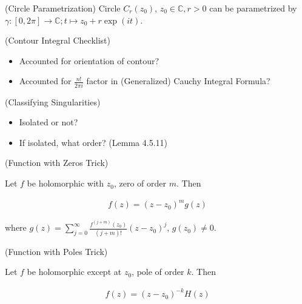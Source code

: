 \documentclass[10pt,landscape]{article}
\begin{document}
\begin{multicols}{3}
\begin{example}{(Circle Parametrization)}{}
    Circle $C_r(z_0)$, $z_0 \in \mathbb{C}, r > 0$ can be parametrized by $\gamma: [0,2\pi] \to \mathbb{C}; t \mapsto z_0 + r \exp\!{(it)}$.

\end{example}

\begin{remark}{(Contour Integral Checklist)}{}

    \begin{itemize}
        \setlength{\parskip}{0em}
        \renewcommand{\labelitemi}{\scriptsize$\square$}
        \item Accounted for orientation of contour?
        \item Accounted for $\frac{n!}{2\pi i}$ factor in (Generalized) Cauchy Integral Formula?
    \end{itemize}

\end{remark}

\begin{remark}{(Classifying Singularities)}{}

    \begin{itemize}
        \setlength{\parskip}{0em}
        \renewcommand{\labelitemi}{\scriptsize$\square$}
        \item Isolated or not?
        \item If isolated, what order? (Lemma 4.5.11)
    \end{itemize}

\end{remark}

\begin{remark}{(Function with Zeros Trick)}{}

    Let $f$ be holomorphic with $z_0$, zero of order $m$. Then

        \begin{align*}
            f(z) = (z - z_0)^m g(z)
        \end{align*}

    where $g(z) = \sum_{j=0}^{\infty} \frac{f^{(j + m)}(z_0)}{(j + m)!} (z - z_0)^j$, $g(z_0) \neq 0$.

\end{remark}

\begin{remark}{(Function with Poles Trick)}{}

    Let $f$ be holomorphic except at $z_0$, pole of order $k$. Then

        \begin{align*}
            f(z) = (z - z_0)^{-k} H(z)
        \end{align*}


\end{remark}
\end{multicols}
\end{document}
